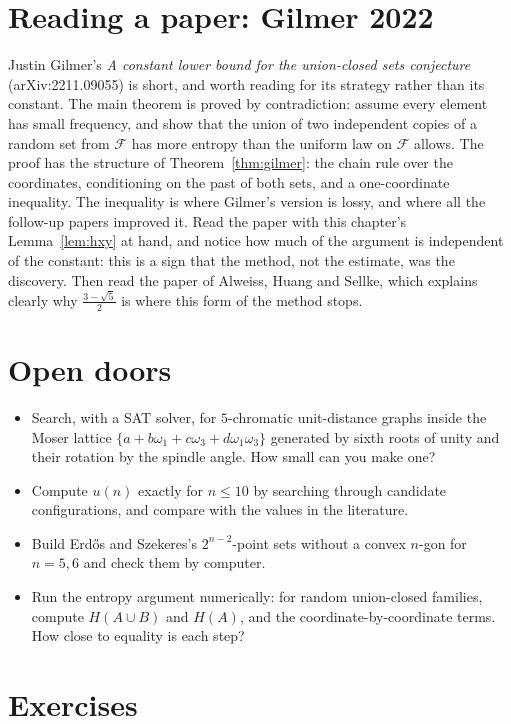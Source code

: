 \section{Reading a paper: Gilmer 2022}

Justin Gilmer's \emph{A constant lower bound for the union-closed sets conjecture} (arXiv:2211.09055) is short, and worth reading for its strategy rather
than its constant. The main theorem is proved by contradiction: assume every element has small frequency, and show that the union of two independent
copies of a random set from $\mathcal F$ has more entropy than the uniform law on $\mathcal F$ allows. The proof has the structure of
Theorem~\ref{thm:gilmer}: the chain rule over the coordinates, conditioning on the past of both sets, and a one-coordinate inequality. The inequality is
where Gilmer's version is lossy, and where all the follow-up papers improved it. Read the paper with this chapter's Lemma~\ref{lem:hxy} at hand, and
notice how much of the argument is independent of the constant: this is a sign that the method, not the estimate, was the discovery. Then read the
paper of Alweiss, Huang and Sellke, which explains clearly why $\frac{3-\sqrt5}2$ is where this form of the method stops.

\section{Open doors}

\begin{itemize}
\item Search, with a SAT solver, for $5$-chromatic unit-distance graphs inside the Moser lattice $\{a+b\omega_1+c\omega_3+d\omega_1\omega_3\}$ generated
by sixth roots of unity and their rotation by the spindle angle. How small can you make one?
\item Compute $u(n)$ exactly for $n\le10$ by searching through candidate configurations, and compare with the values in the literature.
\item Build Erd\H os and Szekeres's $2^{n-2}$-point sets without a convex $n$-gon for $n=5,6$ and check them by computer.
\item Run the entropy argument numerically: for random union-closed families, compute $H(A\cup B)$ and $H(A)$, and the coordinate-by-coordinate terms.
How close to equality is each step?
\end{itemize}

\section{Exercises}


